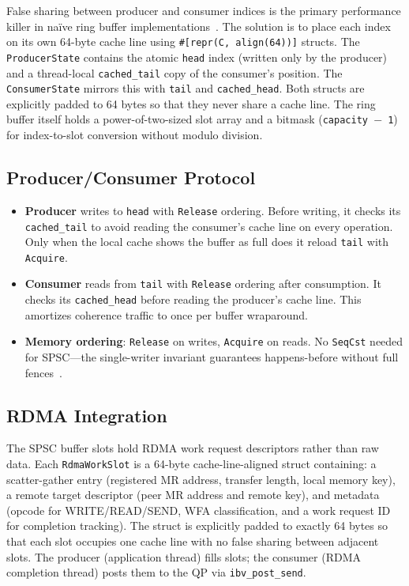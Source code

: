 \documentclass[11pt,letterpaper]{article}
\begin{document}
False sharing between producer and consumer indices is the primary performance killer in na\"ive ring buffer implementations~\cite{drepper2007memory}. The solution is to place each index on its own 64-byte cache line using \texttt{\#[repr(C, align(64))]} structs. The \texttt{ProducerState} contains the atomic \texttt{head} index (written only by the producer) and a thread-local \texttt{cached\_tail} copy of the consumer's position. The \texttt{ConsumerState} mirrors this with \texttt{tail} and \texttt{cached\_head}. Both structs are explicitly padded to 64 bytes so that they never share a cache line. The ring buffer itself holds a power-of-two-sized slot array and a bitmask (\texttt{capacity $-$ 1}) for index-to-slot conversion without modulo division.

\subsection{Producer/Consumer Protocol}

\begin{itemize}
    \item \textbf{Producer} writes to \texttt{head} with \texttt{Release} ordering. Before writing, it checks its \texttt{cached\_tail} to avoid reading the consumer's cache line on every operation. Only when the local cache shows the buffer as full does it reload \texttt{tail} with \texttt{Acquire}.

    \item \textbf{Consumer} reads from \texttt{tail} with \texttt{Release} ordering after consumption. It checks its \texttt{cached\_head} before reading the producer's cache line. This amortizes coherence traffic to once per buffer wraparound.

    \item \textbf{Memory ordering}: \texttt{Release} on writes, \texttt{Acquire} on reads. No \texttt{SeqCst} needed for SPSC---the single-writer invariant guarantees happens-before without full fences~\cite{boehm2008foundations}.
\end{itemize}

\subsection{RDMA Integration}

The SPSC buffer slots hold RDMA work request descriptors rather than raw data. Each \texttt{RdmaWorkSlot} is a 64-byte cache-line-aligned struct containing: a scatter-gather entry (registered MR address, transfer length, local memory key), a remote target descriptor (peer MR address and remote key), and metadata (opcode for WRITE/READ/SEND, WFA classification, and a work request ID for completion tracking). The struct is explicitly padded to exactly 64 bytes so that each slot occupies one cache line with no false sharing between adjacent slots. The producer (application thread) fills slots; the consumer (RDMA completion thread) posts them to the QP via \texttt{ibv\_post\_send}.
\end{document}
